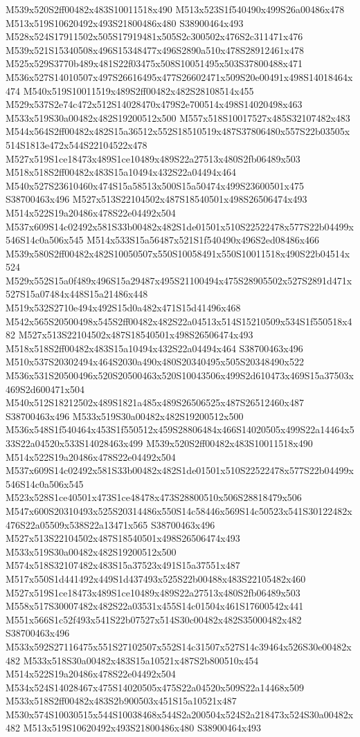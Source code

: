 \documentclass{article}
\begin{document}
\begin{multicols}{2}
M539x520S2ff00482x483S10011518x490 M513x523S1f540490x499S26a00486x478 M513x519S10620492x493S21800486x480 S38900464x493 M528x524S17911502x505S17919481x505S2c300502x476S2c311471x476 M539x521S15340508x496S15348477x496S2890a510x478S28912461x478 M525x529S3770b489x481S22f03475x508S10051495x503S37800488x471 M536x527S14010507x497S26616495x477S26602471x509S20e00491x498S14018464x474 M540x519S10011519x489S2ff00482x482S28108514x455 M529x537S2e74c472x512S14028470x479S2e700514x498S14020498x463 M533x519S30a00482x482S19200512x500 M557x518S10017527x485S32107482x483 M544x564S2ff00482x482S15a36512x552S18510519x487S37806480x557S22b03505x514S1813e472x544S22104522x478 M527x519S1ce18473x489S1ce10489x489S22a27513x480S2fb06489x503 M518x518S2ff00482x483S15a10494x432S22a04494x464 M540x527S23610460x474S15a58513x500S15a50474x499S23600501x475 S38700463x496 M527x513S22104502x487S18540501x498S26506474x493 M514x522S19a20486x478S22e04492x504 M537x609S14c02492x581S33b00482x482S1de01501x510S22522478x577S22b04499x546S14c0a506x545 M514x533S15a56487x521S1f540490x496S2ed08486x466 M539x580S2ff00482x482S10050507x550S10058491x550S10011518x490S22b04514x524 M529x552S15a0f489x496S15a29487x495S21100494x475S28905502x527S2891d471x527S15a07484x448S15a21486x448 M519x532S2710e494x492S15d0a482x471S15d41496x468 M542x565S20500498x545S2ff00482x482S22a04513x514S15210509x534S1f550518x482 M527x513S22104502x487S18540501x498S26506474x493 M518x518S2ff00482x483S15a10494x432S22a04494x464 S38700463x496 M510x537S20302494x464S2030a490x480S20340495x505S20348490x522 M536x531S20500496x520S20500463x520S10043506x499S2d610473x469S15a37503x469S2d600471x504 M540x512S18212502x489S1821a485x489S26506525x487S26512460x487 S38700463x496 M533x519S30a00482x482S19200512x500 M536x548S1f540464x453S1f550512x459S28806484x466S14020505x499S22a14464x533S22a04520x533S14028463x499 M539x520S2ff00482x483S10011518x490 M514x522S19a20486x478S22e04492x504 M537x609S14c02492x581S33b00482x482S1de01501x510S22522478x577S22b04499x546S14c0a506x545 M523x528S1ce40501x473S1ce48478x473S28800510x506S28818479x506 M547x600S20310493x525S20314486x550S14c58446x569S14c50523x541S30122482x476S22a05509x538S22a13471x565 S38700463x496 M527x513S22104502x487S18540501x498S26506474x493 M533x519S30a00482x482S19200512x500 M574x518S32107482x483S15a37523x491S15a37551x487 M517x550S1d441492x449S1d437493x525S22b00488x483S22105482x460 M527x519S1ce18473x489S1ce10489x489S22a27513x480S2fb06489x503 M558x517S30007482x482S22a03531x455S14c01504x461S17600542x441 M551x566S1c52f493x541S22b07527x514S30c00482x482S35000482x482 S38700463x496 M533x592S27116475x551S27102507x552S14c31507x527S14c39464x526S30e00482x482 M533x518S30a00482x483S15a10521x487S2b800510x454 M514x522S19a20486x478S22e04492x504 M534x524S14028467x475S14020505x475S22a04520x509S22a14468x509 M533x518S2ff00482x483S2b900503x451S15a10521x487 M530x574S10030515x544S10038468x544S2a200504x524S2a218473x524S30a00482x482 M513x519S10620492x493S21800486x480 S38900464x493


\end{multicols}
\end{document}

